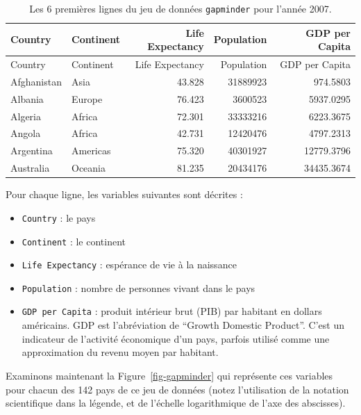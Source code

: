 \documentclass[
  letterpaper,
  DIV=11,
  numbers=noendperiod]{scrreprt}
\providecommand{\tightlist}{%
  \setlength{\itemsep}{0pt}\setlength{\parskip}{0pt}}\usepackage{longtable,booktabs,array}
\begin{document}
\begin{longtable}[]{@{}llrrr@{}}
\caption{Les 6 premières lignes du jeu de données \texttt{gapminder}
pour l'année 2007.}\tabularnewline
\toprule()
Country & Continent & Life Expectancy & Population & GDP per Capita \\
\midrule()
\endfirsthead
\toprule()
Country & Continent & Life Expectancy & Population & GDP per Capita \\
\midrule()
\endhead
Afghanistan & Asia & 43.828 & 31889923 & 974.5803 \\
Albania & Europe & 76.423 & 3600523 & 5937.0295 \\
Algeria & Africa & 72.301 & 33333216 & 6223.3675 \\
Angola & Africa & 42.731 & 12420476 & 4797.2313 \\
Argentina & Americas & 75.320 & 40301927 & 12779.3796 \\
Australia & Oceania & 81.235 & 20434176 & 34435.3674 \\
\bottomrule()
\end{longtable}

Pour chaque ligne, les variables suivantes sont décrites :

\begin{itemize}
\tightlist
\item
  \texttt{Country} : le pays
\item
  \texttt{Continent} : le continent
\item
  \texttt{Life\ Expectancy} : espérance de vie à la naissance
\item
  \texttt{Population} : nombre de personnes vivant dans le pays
\item
  \texttt{GDP\ per\ Capita} : produit intérieur brut (PIB) par habitant
  en dollars américains. GDP est l'abréviation de ``Growth Domestic
  Product''. C'est un indicateur de l'activité économique d'un pays,
  parfois utilisé comme une approximation du revenu moyen par habitant.
\end{itemize}

Examinons maintenant la Figure~\ref{fig-gapminder} qui représente ces
variables pour chacun des 142 pays de ce jeu de données (notez
l'utilisation de la notation scientifique dans la légende, et de
l'échelle logarithmique de l'axe des abscisses).
\end{document}
